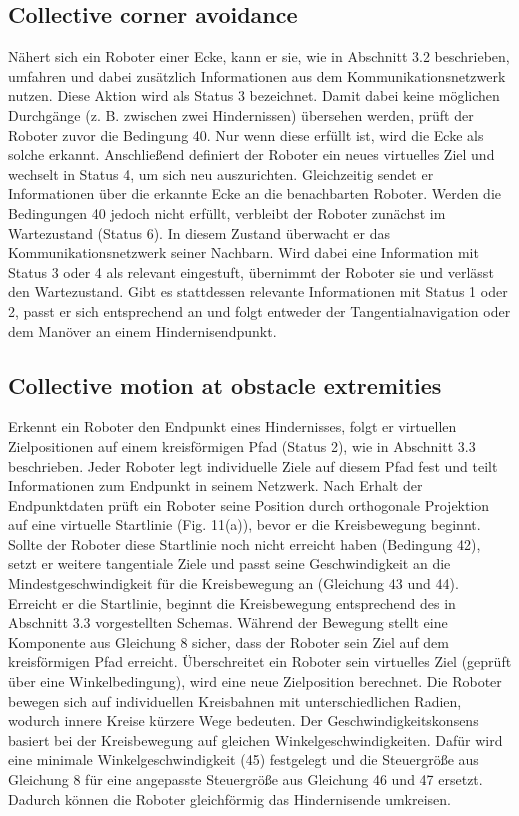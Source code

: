 \documentclass[conference]{IEEEtran}
\begin{document}
\subsection*{Collective corner avoidance}
Nähert sich ein Roboter einer Ecke, kann er sie, wie in Abschnitt 3.2 beschrieben, 
umfahren und dabei zusätzlich Informationen aus dem Kommunikationsnetzwerk nutzen. 
Diese Aktion wird als Status 3 bezeichnet. Damit dabei keine möglichen Durchgänge 
(z. B. zwischen zwei Hindernissen) übersehen werden, prüft der Roboter zuvor die 
Bedingung 40. Nur wenn diese erfüllt ist, wird die Ecke als solche erkannt.
Anschließend definiert der Roboter ein neues virtuelles Ziel und wechselt in Status 4, 
um sich neu auszurichten. Gleichzeitig sendet er Informationen über die erkannte Ecke 
an die benachbarten Roboter.
Werden die Bedingungen 40 jedoch nicht erfüllt, verbleibt der Roboter zunächst im 
Wartezustand (Status 6). In diesem Zustand überwacht er das Kommunikationsnetzwerk 
seiner Nachbarn. Wird dabei eine Information mit Status 3 oder 4 als relevant 
eingestuft, übernimmt der Roboter sie und verlässt den Wartezustand. Gibt es 
stattdessen relevante Informationen mit Status 1 oder 2, passt er sich entsprechend 
an und folgt entweder der Tangentialnavigation oder dem Manöver an einem Hindernisendpunkt.

\subsection*{Collective motion at obstacle extremities}
Erkennt ein Roboter den Endpunkt eines Hindernisses, folgt er virtuellen Zielpositionen 
auf einem kreisförmigen Pfad (Status 2), wie in Abschnitt 3.3 beschrieben. Jeder 
Roboter legt individuelle Ziele auf diesem Pfad fest und teilt Informationen zum 
Endpunkt in seinem Netzwerk. Nach Erhalt der Endpunktdaten prüft ein Roboter seine 
Position durch orthogonale Projektion auf eine virtuelle Startlinie (Fig. 11(a)), 
bevor er die Kreisbewegung beginnt. Sollte der Roboter diese Startlinie noch nicht 
erreicht haben (Bedingung 42), setzt er weitere tangentiale Ziele und passt seine 
Geschwindigkeit an die Mindestgeschwindigkeit für die Kreisbewegung an 
(Gleichung 43 und 44). Erreicht er die Startlinie, beginnt die Kreisbewegung 
entsprechend des in Abschnitt 3.3 vorgestellten Schemas.
Während der Bewegung stellt eine Komponente aus Gleichung 8 sicher, dass der Roboter 
sein Ziel auf dem kreisförmigen Pfad erreicht. Überschreitet ein Roboter sein 
virtuelles Ziel (geprüft über eine Winkelbedingung), wird eine neue Zielposition 
berechnet. Die Roboter bewegen sich auf individuellen Kreisbahnen mit 
unterschiedlichen Radien, wodurch innere Kreise kürzere Wege bedeuten. 
Der Geschwindigkeitskonsens basiert bei der Kreisbewegung auf gleichen 
Winkelgeschwindigkeiten. Dafür wird eine minimale Winkelgeschwindigkeit (45) 
festgelegt und die Steuergröße aus Gleichung 8 für eine angepasste Steuergröße 
aus Gleichung 46 und 47 ersetzt. Dadurch können die Roboter gleichförmig das 
Hindernisende umkreisen.
\end{document}
